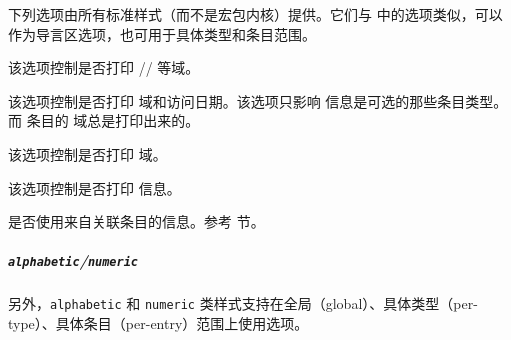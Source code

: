 下列选项由所有标准样式（而不是宏包内核）提供。它们与  中的选项类似，可以作为导言区选项，也可用于具体类型和条目范围。

\begin{optionlist}


该选项控制是否打印 \slash {}\slash {} 等域。


该选项控制是否打印  域和访问日期。该选项只影响  信息是可选的那些条目类型。而  条目的  域总是打印出来的。


该选项控制是否打印  域。


该选项控制是否打印  信息。

%
%
是否使用来自关联条目的信息。参考  节。

\end{optionlist}


\subparagraph{\texttt{alphabetic}/\texttt{numeric}} 另外，\texttt{alphabetic} 和 \texttt{numeric} 类样式支持在全局（global）、具体类型（per-type）、具体条目（per-entry）范围上使用选项。

